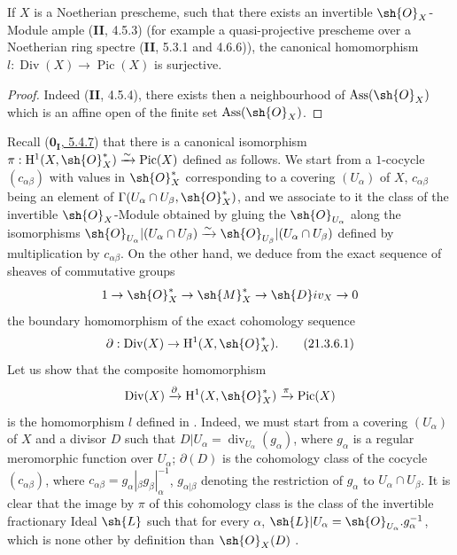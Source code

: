 \begin{corollary}[21.3.5]
\label{IV.21.3.5}
If $X$ is a Noetherian prescheme, such that there exists an invertible $\sh{O}_X$-Module ample (\textbf{II}, 4.5.3) (for example a quasi-projective prescheme over a Noetherian ring spectre (\textbf{II}, 5.3.1 and 4.6.6)), the canonical homomorphism $l:\operatorname{Div}(X)\to\operatorname{Pic}(X)$ is surjective.
\end{corollary}

\begin{proof}
Indeed (\textbf{II}, 4.5.4), there exists then a neighbourhood of $\operatorname{Ass}(\sh{O}_X)$ which is an affine open of the finite set $\operatorname{Ass}(\sh{O}_X)$.
\end{proof}


\begin{remark}[21.3.6]
\label{IV.21.3.6}
Recall (\hyperref[0.5.4.7]{$\mathbf{0_I}$, 5.4.7}) that there is a canonical isomorphism $\pi:\mathrm{H}^1(X,\sh{O}_X^*)\xrightarrow{\sim}\operatorname{Pic}(X)$ defined as follows.
We start from a $1$-cocycle $(c_{\alpha\beta})$ with values in $\sh{O}_X^*$ corresponding to a covering $(U_\alpha)$ of $X$, $c_{\alpha\beta}$ being an element of $\Gamma(U_\alpha\cap U_\beta,\sh{O}_X^*)$, and we associate to it the class of the invertible $\sh{O}_X$-Module obtained by gluing the $\sh{O}_{U_\alpha}$ along the isomorphisms $\sh{O}_{U_\alpha}|(U_\alpha\cap U_\beta)\xrightarrow{\sim}\sh{O}_{U_\beta}|(U_\alpha\cap U_\beta)$ defined by multiplication by $c_{\alpha\beta}$.
On the other hand, we deduce from the exact sequence of sheaves of commutative groups
\[
  1\to\sh{O}_X^*\to\sh{M}_X^*\to\sh{D}iv_X\to 0
\]
the boundary homomorphism of the exact cohomology sequence
\[
\label{IV.21.3.6.1}
  \partial:\operatorname{Div}(X)\to\mathrm{H}^1(X,\sh{O}_X^*).
  \tag{21.3.6.1}
\]
Let us show that the composite homomorphism
\[
  \operatorname{Div}(X)\xrightarrow{\partial}\mathrm{H}^1(X,\sh{O}_X^*)\xrightarrow{\pi}\operatorname{Pic}(X)
\]
is the homomorphism $l$ defined in .
Indeed, we must start from a covering $(U_\alpha)$ of $X$ and a divisor $D$ such that $D|U_\alpha=\operatorname{div}_{U_\alpha}(g_\alpha)$, where $g_\alpha$ is a regular meromorphic function over $U_\alpha$;
$\partial(D)$ is the cohomology class of the cocycle $(c_{\alpha\beta})$, where $c_{\alpha\beta}=g_\alpha|_\beta g_\beta|_\alpha^{-1}$, $g_{\alpha|\beta}$ denoting the restriction of $g_\alpha$ to $U_\alpha\cap U_\beta$.
It is clear that the image by $\pi$ of this cohomology class is the class of the invertible fractionary Ideal $\sh{L}$ such that for every $\alpha$, $\sh{L}|U_\alpha=\sh{O}_{U_\alpha}.g_\alpha^{-1}$, which is none other by definition than $\sh{O}_X(D)$ .
\end{remark}


